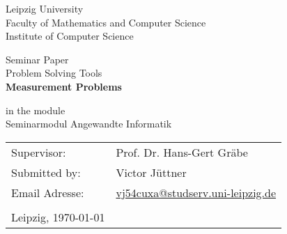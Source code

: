 \begin{titlepage}

	\sffamily
    \large
	\begin{flushleft}
	   \doublespacing
	    Leipzig University 				   \\
	    Faculty of Mathematics and Computer Science \\
	    Institute of Computer Science				   \\
	\end{flushleft}
	
	\begin{center}
        \vspace{4cm}	
		\large
		Seminar Paper \\
		
		\Huge
		Problem Solving Tools \\
        \textbf{Measurement Problems}\\
      
        
        \vspace{5mm}
        
        \large
		in the module \\
        Seminarmodul Angewandte Informatik
	\end{center}
	
	\vfill

    \renewcommand{\arraystretch}{1.5}
	\begin{tabular}{ll}
	        Supervisor:     & Prof. Dr. Hans-Gert Gräbe \\
			Submitted by: 	& Victor Jüttner \\
			Email Adresse: & \multicolumn{1}{p{7cm}}{ 
			\href{mailto:vj54cuxa@studserv.uni-leipzig.de}{vj54cuxa@studserv.uni-leipzig.de}
			} \\
			& \\
			Leipzig, \today
	\end{tabular}
	
\end{titlepage} 
